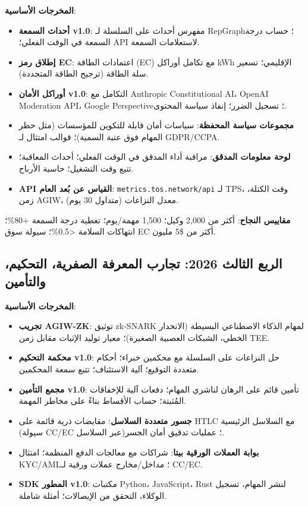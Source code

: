 \documentclass[11pt]{article}
\begin{document}
\textbf{المخرجات الأساسية}:
\begin{itemize}[noitemsep]
  \item \textbf{أحداث السمعة v1.0}: مفهرس أحداث على السلسلة لـ RepGraph؛ حساب درجة السمعة في الوقت الفعلي؛ API لاستعلامات السمعة.
  \item \textbf{إطلاق رمز EC}: اعتمادات الطاقة (EC) مع تكامل أوراكل kWh الإقليمي؛ تسعير سلة الطاقة (ترجيح الطاقة المتجددة).
  \item \textbf{أوراكل الأمان v1.0}: التكامل مع Anthropic Constitutional AI، OpenAI Moderation API، Google Perspective؛ تسجيل الضرر؛ إنفاذ سياسة المحتوى.
  \item \textbf{مجموعات سياسة المحفظة}: سياسات أمان قابلة للتكوين للمؤسسات (مثل حظر المهام فوق عتبة السمية)؛ قوالب امتثال لـ GDPR/CCPA.
  \item \textbf{لوحة معلومات المدقق}: مراقبة أداء المدقق في الوقت الفعلي؛ أحداث المعاقبة؛ تتبع وقت التشغيل؛ حاسبة الأرباح.
  \item \textbf{API القياس عن بُعد العام}: \texttt{metrics.tos.network/api} لـ TPS، وقت الكتلة، زمن AGIW، معدل النزاعات (متداول 30 يوم).
\end{itemize}

\textbf{مقاييس النجاح}: أكثر من 2,000 وكيل؛ 1,500 مهمة/يوم؛ تغطية درجة السمعة +80\%؛ انتهاكات السلامة <0.5\%؛ سيولة سوق EC أكثر من \$5 مليون.

\subsection{الربع الثالث 2026: تجارب المعرفة الصفرية، التحكيم، والتأمين}

\textbf{المخرجات الأساسية}:
\begin{itemize}[noitemsep]
  \item \textbf{تجريب AGIW-ZK}: توثيق zk-SNARK لمهام الذكاء الاصطناعي البسيطة (الانحدار الخطي، الشبكات العصبية الصغيرة)؛ معيار توليد الإثبات مقابل زمن TEE.
  \item \textbf{محكمة التحكيم v1.0}: حل النزاعات على السلسلة مع محكمين خبراء؛ أحكام متعددة التوقيع؛ آلية الاستئناف؛ تتبع سمعة المحكمين.
  \item \textbf{مجمع التأمين v1.0}: تأمين قائم على الرهان لناشري المهام؛ دفعات آلية للإخفاقات المُثبتة؛ حساب الأقساط بناءً على مخاطر المهمة.
  \item \textbf{جسور متعددة السلاسل}: مقايضات ذرية قائمة على HTLC مع السلاسل الرئيسية (سيولة CC/EC عبر السلاسل)؛ عمليات تدقيق أمان الجسر.
  \item \textbf{بوابة العملات الورقية بيتا}: شراكات مع معالجات الدفع المنظمة؛ امتثال KYC/AML؛ مداخل/مخارج عملات ورقية لـ CC/EC.
  \item \textbf{SDK المطور v1.0}: مكتبات Python، JavaScript، Rust لنشر المهام، تسجيل الوكلاء، التحقق من الإيصالات؛ أمثلة شاملة.
\end{itemize}
\end{document}
